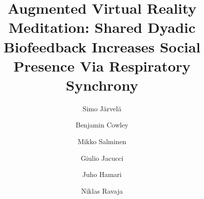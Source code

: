 \documentclass[manuscript, review = false, screen]{acmart}
\begin{document}
%

\title[Augmented Virtual Reality Meditation: Shared Dyadic Biofeedback Increases Social Presence Via Respiratory Synchrony]{Augmented Virtual Reality Meditation: Shared Dyadic Biofeedback Increases Social Presence Via Respiratory Synchrony}



%


\author{Simo Järvelä}

\author{Benjamin Cowley}

\author{Mikko Salminen}

\author{Giulio Jacucci}

\author{Juho Hamari}


\author{Niklas Ravaja}





%
\renewcommand{\shortauthors}{Järvelä, et al.}

%
\end{document}
